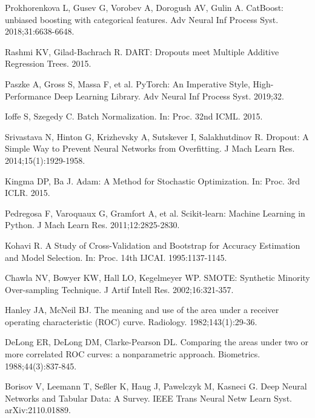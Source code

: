 \documentclass[10pt]{article} %
\begin{document}
\begin{small}
\noindent [29] Prokhorenkova L, Gusev G, Vorobev A, Dorogush AV, Gulin A. CatBoost: unbiased boosting with categorical features. Adv Neural Inf Process Syst. 2018;31:6638-6648.

\noindent [30] Rashmi KV, Gilad-Bachrach R. DART: Dropouts meet Multiple Additive Regression Trees. 2015.

\noindent [31] Paszke A, Gross S, Massa F, et al. PyTorch: An Imperative Style, High-Performance Deep Learning Library. Adv Neural Inf Process Syst. 2019;32.

\noindent [32] Ioffe S, Szegedy C. Batch Normalization. In: Proc. 32nd ICML. 2015.

\noindent [33] Srivastava N, Hinton G, Krizhevsky A, Sutskever I, Salakhutdinov R. Dropout: A Simple Way to Prevent Neural Networks from Overfitting. J Mach Learn Res. 2014;15(1):1929-1958.

\noindent [34] Kingma DP, Ba J. Adam: A Method for Stochastic Optimization. In: Proc. 3rd ICLR. 2015.

\noindent [35] Pedregosa F, Varoquaux G, Gramfort A, et al. Scikit-learn: Machine Learning in Python. J Mach Learn Res. 2011;12:2825-2830.

\noindent [36] Kohavi R. A Study of Cross-Validation and Bootstrap for Accuracy Estimation and Model Selection. In: Proc. 14th IJCAI. 1995:1137-1145.

\noindent [37] Chawla NV, Bowyer KW, Hall LO, Kegelmeyer WP. SMOTE: Synthetic Minority Over-sampling Technique. J Artif Intell Res. 2002;16:321-357.

\noindent [38] Hanley JA, McNeil BJ. The meaning and use of the area under a receiver operating characteristic (ROC) curve. Radiology. 1982;143(1):29-36.

\noindent [39] DeLong ER, DeLong DM, Clarke-Pearson DL. Comparing the areas under two or more correlated ROC curves: a nonparametric approach. Biometrics. 1988;44(3):837-845.

\noindent [40] Borisov V, Leemann T, Seßler K, Haug J, Pawelczyk M, Kasneci G. Deep Neural Networks and Tabular Data: A Survey. IEEE Trans Neural Netw Learn Syst. arXiv:2110.01889.
\end{small}
\end{document}
